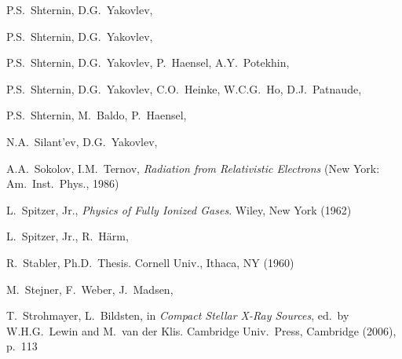 \documentclass[smallextended]{svjour3}       %
\begin{document}
\begin{thebibliography}{}
P.S.~Shternin, D.G.~Yakovlev,

P.S.~Shternin, D.G.~Yakovlev,

P.S.~Shternin, D.G.~Yakovlev, P.~Haensel, A.Y.~Potekhin,

P.S.~Shternin, D.G.~Yakovlev, C.O.~Heinke, W.C.G.~Ho, D.J.~Patnaude,

P.S.~Shternin, M.~Baldo, P.~Haensel,

N.A.~Silant'ev, D.G.~Yakovlev,

A.A.~Sokolov, I.M.~Ternov,
\textit{Radiation from Relativistic Electrons}
(New York: Am.\ Inst.\ Phys., 1986)

L.~Spitzer, Jr., 
\textit{Physics of Fully Ionized Gases}.
Wiley, New York (1962)

L.~Spitzer, Jr., R.~H\"arm,

R.~Stabler,
Ph.D.\ Thesis. Cornell Univ., Ithaca, NY (1960)

M.~Stejner, F.~Weber, J.~Madsen,

T.~Strohmayer, L.~Bildsten,
in \textit{Compact Stellar X-Ray Sources},
ed.~by W.H.G.~Lewin and M.~van der Klis.
Cambridge Univ.\ Press, Cambridge (2006), p.~113


\end{thebibliography}
\end{document}
